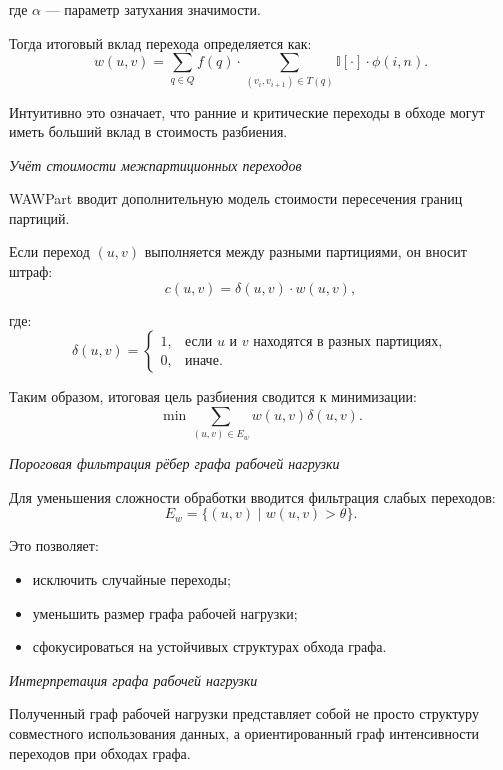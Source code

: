 где $\alpha$ --- параметр затухания значимости.

Тогда итоговый вклад перехода определяется как:
\begin{equation*}
w(u,v) = \sum_{q \in Q} f(q)\cdot \sum_{(v_i,v_{i+1})\in T(q)} \mathbb{I}[\cdot]\cdot \phi(i,n).
\end{equation*}

Интуитивно это означает, что ранние и критические переходы в обходе могут иметь больший вклад в стоимость разбиения.

\textit{Учёт стоимости межпартиционных переходов}

WAWPart вводит дополнительную модель стоимости пересечения границ партиций.

Если переход $(u,v)$ выполняется между разными партициями, он вносит штраф:
\begin{equation*}
c(u,v) = \delta(u,v)\cdot w(u,v),
\end{equation*}

где:
\begin{equation*}
\delta(u,v)=
\begin{cases}
1, & \text{если } u \text{ и } v \text{ находятся в разных партициях},\\
0, & \text{иначе}.
\end{cases}
\end{equation*}

Таким образом, итоговая цель разбиения сводится к минимизации:
\begin{equation*}
\min \sum_{(u,v)\in E_w} w(u,v)\delta(u,v).
\end{equation*}

\textit{Пороговая фильтрация рёбер графа рабочей нагрузки}

Для уменьшения сложности обработки вводится фильтрация слабых переходов:
\begin{equation*}
E_w = \{(u,v)\mid w(u,v) > \theta\}.
\end{equation*}

Это позволяет:
\begin{itemize}
    \item исключить случайные переходы;
    \item уменьшить размер графа рабочей нагрузки;
    \item сфокусироваться на устойчивых структурах обхода графа.
\end{itemize}

\textit{Интерпретация графа рабочей нагрузки}

Полученный граф рабочей нагрузки представляет собой не просто структуру совместного использования данных, а ориентированный граф интенсивности переходов при обходах графа.

